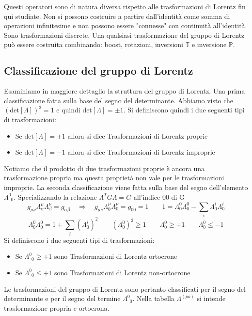 Questi operatori sono di natura diversa rispetto alle trasformazioni di Lorentz fin qui studiate. Non si possono costruire a partire dall'identità come somma di operazioni infinitesime e non possono essere "connesse" con continuità all'identità. Sono trasformazioni discrete. Una qualsiasi trasformazione del gruppo di Lorentz può essere costruita combinando: boost, rotazioni, inversioni $\mathbb{T}$ e inversione $\mathbb{P}$.
\subsection{Classificazione del gruppo di Lorentz}
Esaminiamo in maggiore dettaglio la struttura del gruppo di Lorentz. Una prima classificazione fatta sulla base del segno del determinante. Abbiamo visto che $(\text{det}[\Lambda])^2=1$ e quindi $\text{det}[\Lambda]=\pm1$. Si definiscono quindi i due seguenti tipi di trasformazioni:
\begin{itemize}
	\item Se $\text{det}[\Lambda]=+1$ allora si dice Trasformazioni di Lorentz proprie 
	\item Se $\text{det}[\Lambda]=-1$ allora si dice Trasformazioni di Lorentz improprie 
\end{itemize}
Notiamo che il prodotto di due trasformazioni proprie è ancora una trasformazione propria ma questa proprietà non vale per le trasformazioni improprie. La seconda classificazione viene fatta sulla base del segno dell'elemento $\Lambda^0_{\,\,\,0}$. Specializzando la relazione $\Lambda^TG\Lambda=G$ all'indice $00$ di G
$$
g_{\mu\nu} \Lambda^\mu_\alpha \Lambda^\nu_\beta = g_{\alpha\beta} \quad \Longrightarrow \quad g_{\mu\nu} \Lambda^\mu_0 \Lambda^\nu_0 = g_{00} = 1 \qquad 1 = \Lambda^0_0 \Lambda^0_0 - \sum_i \Lambda^i_0 \Lambda^i_0
$$
$$
\Lambda^0_0 \Lambda^0_0 = 1 + \sum_i (\Lambda^i_0)^2 \qquad (\Lambda^0_0)^2 \ge 1 \qquad \Lambda^0_0 \ge +1 \qquad \Lambda^0_0 \le -1
$$
Si definiscono i due seguenti tipi di trasformazioni:
\begin{itemize}
	\item Se $\Lambda_{\,\,\,0}^0\ge+1$ sono Trasformazioni di Lorentz ortocrone
	\item Se $\Lambda_{\,\,\,0}^0\le+1$ sono Trasformazioni di Lorentz non-ortocrone
\end{itemize}
Le trasformazioni del gruppo di Lorentz sono pertanto classificati per il segno del determinante e per il segno del termine $\Lambda_{\,\,\,0}^0$. Nella tabella $\Lambda^{(po)}$ si intende trasformazione propria e ortocrona.


